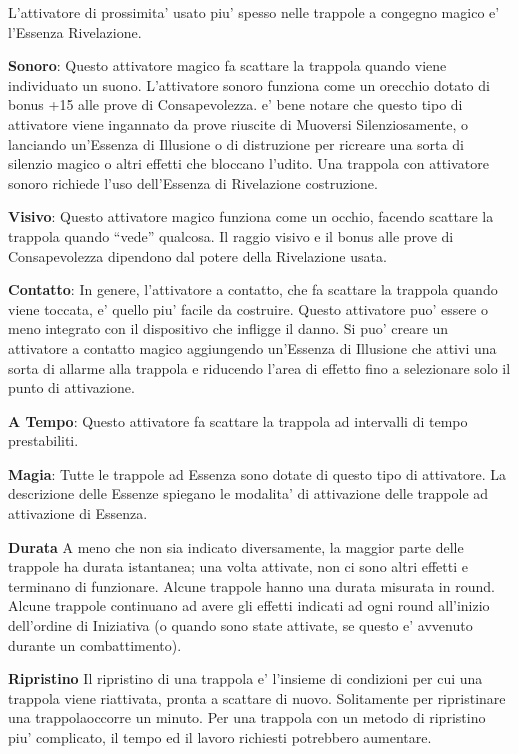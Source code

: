 \documentclass[a4paper,11pt,twoside,openany]{dndbook}
\begin{document}
{L'attivatore di prossimita' usato piu' spesso nelle trappole a congegno magico e' l'Essenza Rivelazione.

\textbf{Sonoro}: Questo attivatore magico fa scattare la trappola quando viene individuato un suono. L'attivatore sonoro funziona come un orecchio dotato di bonus +15 alle prove di Consapevolezza. e' bene notare che questo tipo di attivatore viene ingannato da prove riuscite di Muoversi Silenziosamente, o lanciando un'Essenza di Illusione o di distruzione per ricreare una sorta di silenzio magico o altri effetti che bloccano l'udito. Una trappola con attivatore sonoro richiede l'uso dell'Essenza di Rivelazione costruzione.

\textbf{Visivo}: Questo attivatore magico funziona come un occhio, facendo scattare la trappola quando ``vede'' qualcosa. Il raggio visivo e il bonus alle prove di Consapevolezza dipendono dal potere della Rivelazione usata.

\textbf{Contatto}: In genere, l'attivatore a contatto, che fa scattare la trappola quando viene toccata, e' quello piu' facile da costruire. Questo attivatore puo' essere o meno integrato con il dispositivo che infligge il danno. Si puo' creare un attivatore a contatto magico aggiungendo un'Essenza di Illusione che attivi una sorta di allarme alla trappola e riducendo l'area di effetto fino a selezionare solo il punto di attivazione.

\textbf{A Tempo}: Questo attivatore fa scattare la trappola ad intervalli di tempo prestabiliti.

\textbf{Magia}: Tutte le trappole ad Essenza sono dotate di questo tipo di attivatore. La descrizione delle Essenze spiegano le modalita' di attivazione delle trappole ad attivazione di Essenza. 

\textbf{Durata}
A meno che non sia indicato diversamente, la maggior parte delle trappole ha durata istantanea; una volta attivate, non ci sono altri effetti e terminano di funzionare. Alcune trappole hanno una durata misurata in round. Alcune trappole continuano ad avere gli effetti indicati ad ogni round all'inizio dell'ordine di Iniziativa (o quando sono state attivate, se questo e' avvenuto durante un combattimento).

\textbf{Ripristino}
Il ripristino di una trappola e' l'insieme di condizioni per cui una trappola viene riattivata, pronta a scattare di nuovo. Solitamente per ripristinare una trappolaoccorre un minuto. Per una trappola con un metodo di ripristino piu' complicato, il tempo ed il lavoro richiesti potrebbero aumentare.

}
\end{document}
